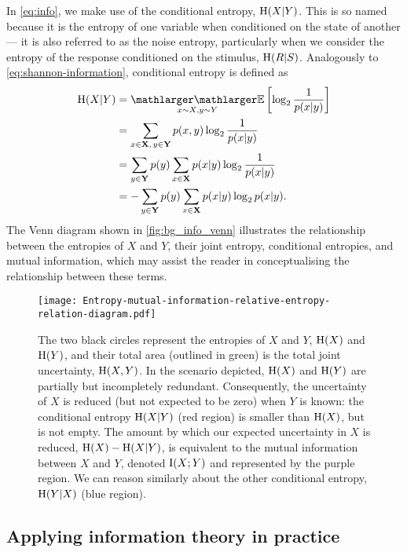 In \autoref{eq:info}, we make use of the conditional entropy, $\operatorname{H}(X | Y)$.
This is so named because it is the entropy of one variable when conditioned on the state of another --- it is also referred to as the noise entropy, particularly when we consider the entropy of the response conditioned on the stimulus, $\operatorname{H}(R|S)$.
Analogously to \autoref{eq:shannon-information}, conditional entropy is defined as
\begin{align}
\HH(X | Y)
  &= \EE_{x\sim X, y\sim Y} \left[ \log_2 \frac{1}{p(x|y)} \right] \notag
\\&= \sum_{x \in \SET{X}, \, y \in \SET{Y}} p(x,y) \log_2 \frac{1}{p(x|y)} \notag
\\&= \sum_{y \in \SET{Y}} p(y) \sum_{x \in \SET{X}} p(x|y) \log_2 \frac{1}{p(x|y)} \notag
\\&= - \sum_{y \in \SET{Y}} p(y) \sum_{x \in \SET{X}} p(x|y) \log_2 p(x|y)
.\end{align}
The Venn diagram shown in \autoref{fig:bg_info_venn} illustrates the relationship between the entropies of $X$ and $Y$, their joint entropy, conditional entropies, and mutual information, which may assist the reader in conceptualising the relationship between these terms.

\begin{figure}[htbp]
\centering
\texttt{[image: Entropy-mutual-information-relative-entropy-relation-diagram.pdf]}
\caption{
The two black circles represent the entropies of $X$ and $Y$, $\operatorname{H}(X)$ and $\operatorname{H}(Y)$, and their total area (outlined in green) is the total joint uncertainty, $\operatorname{H}(X, Y)$.
In the scenario depicted, $\operatorname{H}(X)$ and $\operatorname{H}(Y)$ are partially but incompletely redundant.
Consequently, the uncertainty of $X$ is reduced (but not expected to be zero) when $Y$ is known: the conditional entropy $\operatorname{H}(X|Y)$ (red region) is smaller than $\operatorname{H}(X)$, but is not empty.
The amount by which our expected uncertainty in $X$ is reduced, $\operatorname{H}(X) - \operatorname{H}(X|Y)$, is equivalent to the mutual information between $X$ and $Y$, denoted $\operatorname{I}(X;Y)$ and represented by the purple region.
We can reason similarly about the other conditional entropy, $\operatorname{H}(Y|X)$ (blue region).
}
\label{fig:bg_info_venn}
\end{figure}


\subsection{Applying information theory in practice}

